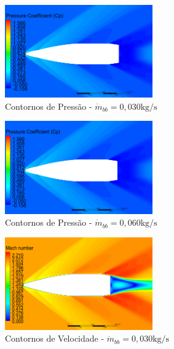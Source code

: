 \begin{figure}[!ht]
	\centering
	\begin{subfigure}[b]{0.47\textwidth}
        \centering
        \includegraphics[width=\textwidth,height=4cm]{contorno-pressao-1500K-vazao-0030-2pol.png}
        \caption{Contornos de Pressão - $\Dot{m}_{bb} = 0,030 \unit{\kg/\s}$}
        \label{fig:contorno-pressao-bb-1500K-vazao0030}
    \end{subfigure}
    \hfill
    \begin{subfigure}[b]{0.47\textwidth}
        \centering
        \includegraphics[width=\textwidth,height=4cm]{contorno-pressao-1500K-vazao-0060-2pol.png}
        \caption{Contornos de Pressão - $\Dot{m}_{bb} = 0,060 \unit{\kg/\s}$}
        \label{fig:contorno-pressao-bb-1500K-vazao0060}
    \end{subfigure}
    \hfill
	\begin{subfigure}[b]{0.47\textwidth}
        \centering
        \includegraphics[width=\textwidth,height=4cm]{contorno-velocidade-1500K-vazao-0030-2pol.png}
        \caption{Contornos de Velocidade - $\Dot{m}_{bb} = 0,030 \unit{\kg/\s}$}
        \label{fig:contorno-velocidade-bb-1500K-vazao0030}
    \end{subfigure}
    \hfill
	\begin{subfigure}[b]{0.47\textwidth}

\end{subfigure}
\end{figure}
